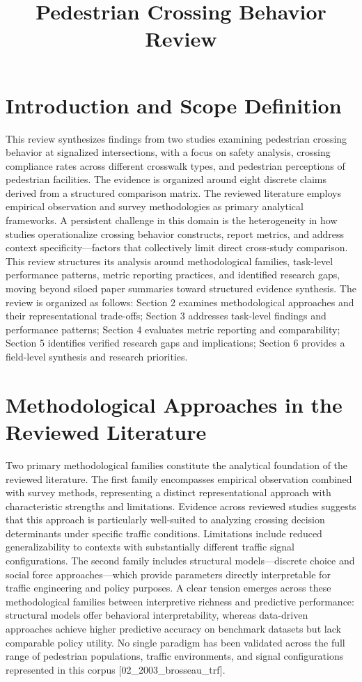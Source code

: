 \documentclass{article}
\title{Pedestrian Crossing Behavior Review}
\begin{document}
\maketitle
\section{Introduction and Scope Definition}
This review synthesizes findings from two studies examining pedestrian crossing behavior at signalized intersections, with a focus on safety analysis, crossing compliance rates across different crosswalk types, and pedestrian perceptions of pedestrian facilities. The evidence is organized around eight discrete claims derived from a structured comparison matrix. The reviewed literature employs empirical observation and survey methodologies as primary analytical frameworks. A persistent challenge in this domain is the heterogeneity in how studies operationalize crossing behavior constructs, report metrics, and address context specificity—factors that collectively limit direct cross-study comparison. This review structures its analysis around methodological families, task-level performance patterns, metric reporting practices, and identified research gaps, moving beyond siloed paper summaries toward structured evidence synthesis. The review is organized as follows: Section 2 examines methodological approaches and their representational trade-offs; Section 3 addresses task-level findings and performance patterns; Section 4 evaluates metric reporting and comparability; Section 5 identifies verified research gaps and implications; Section 6 provides a field-level synthesis and research priorities.

\section{Methodological Approaches in the Reviewed Literature}
Two primary methodological families constitute the analytical foundation of the reviewed literature. The first family encompasses empirical observation combined with survey methods, representing a distinct representational approach with characteristic strengths and limitations. Evidence across reviewed studies suggests that this approach is particularly well-suited to analyzing crossing decision determinants under specific traffic conditions. Limitations include reduced generalizability to contexts with substantially different traffic signal configurations. The second family includes structural models—discrete choice and social force approaches—which provide parameters directly interpretable for traffic engineering and policy purposes. A clear tension emerges across these methodological families between interpretive richness and predictive performance: structural models offer behavioral interpretability, whereas data-driven approaches achieve higher predictive accuracy on benchmark datasets but lack comparable policy utility. No single paradigm has been validated across the full range of pedestrian populations, traffic environments, and signal configurations represented in this corpus [02_2003_brosseau_trf].
\end{document}
